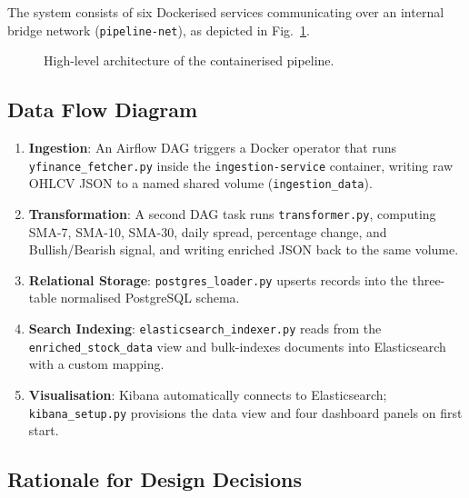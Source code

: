\documentclass[conference]{IEEEtran}
\begin{document}
The system consists of six Dockerised services communicating over an internal
bridge network (\texttt{pipeline-net}), as depicted in Fig.~\ref{fig:arch}.

\begin{figure}[ht]
  \centering
  \caption{High-level architecture of the containerised pipeline.}
  \label{fig:arch}
\end{figure}

\subsection{Data Flow Diagram}

\begin{enumerate}
  \item \textbf{Ingestion}: An Airflow DAG triggers a Docker operator that runs
    \texttt{yfinance\_fetcher.py} inside the \texttt{ingestion-service} container,
    writing raw OHLCV JSON to a named shared volume (\texttt{ingestion\_data}).
  \item \textbf{Transformation}: A second DAG task runs \texttt{transformer.py},
    computing SMA-7, SMA-10, SMA-30, daily spread, percentage change, and
    Bullish/Bearish signal, and writing enriched JSON back to the same volume.
  \item \textbf{Relational Storage}: \texttt{postgres\_loader.py} upserts records
    into the three-table normalised PostgreSQL schema.
  \item \textbf{Search Indexing}: \texttt{elasticsearch\_indexer.py} reads from
    the \texttt{enriched\_stock\_data} view and bulk-indexes documents into
    Elasticsearch with a custom mapping.
  \item \textbf{Visualisation}: Kibana automatically connects to Elasticsearch;
    \texttt{kibana\_setup.py} provisions the data view and four dashboard panels
    on first start.
\end{enumerate}

\subsection{Rationale for Design Decisions}
\end{document}
